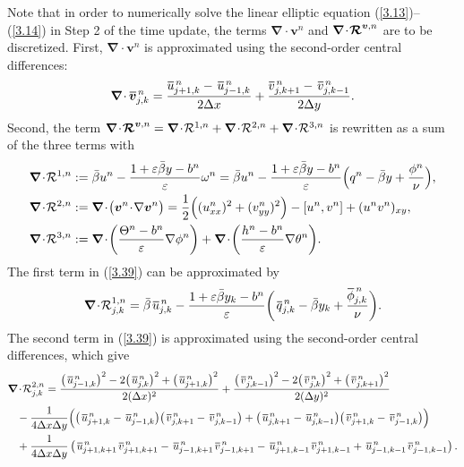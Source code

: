 \documentclass[a4paper,11pt,twoside]{article}
\numberwithin{equation}{section}
\numberwithin{figure}{section}
\numberwithin{table}{section}
\newcommand{\hf}{\frac{1}{2}}
\newcommand{\bnabla}{\bm{\nabla}}
\newcommand{\eps}{\varepsilon}
\newcommand{\dx}{\Delta x}
\newcommand{\dy}{\Delta y}
\newcommand{\bv}{\bm{v}}
\newcommand\eref[1]{(\ref{#1})}
\newcommand*\xbar[1]{%
	\hbox{%
		\vbox{%
			\hrule height 0.5pt %
			\kern0.3ex%
			\hbox{%
				\kern-0.05em%
				\ensuremath{#1}%
				\kern-0.02em%
			}%
		}%
	}%
}
\begin{document}
Note that in order to numerically solve the linear elliptic equation \eref{3.13}--\eref{3.14} in Step 2 of the time update, the terms 
$\bnabla\!\cdot\!\bv^n$ and $\bnabla\!\cdot\!\bm{{\cal R}}^{\bv,n}$ are to be discretized. First, $\bnabla\!\cdot\!\bv^n$ is approximated
using the second-order central differences:
\begin{equation}
\bnabla\!\cdot\xbar{\bv}_{j,k}^{\,n}=\frac{\xbar u_{j+1,k}^{\,n}-\,\xbar u_{j-1,k}^{\,n}}{2\dx}+
\frac{\xbar v_{j,k+1}^{\,n}-\,\xbar v_{j,k-1}^{\,n}}{2\dy}.
\label{3.38}
\end{equation}
Second, the term $\bnabla\!\cdot\!\bm{{\cal R}}^{\bv,n}=\bnabla\!\cdot\!{\cal R}^{1,n}+\bnabla\!\cdot\!{\cal R}^{2,n}+
\bnabla\!\cdot\!{\cal R}^{3,n}$ is rewritten as a sum of the three terms with
\begin{equation}
\begin{aligned}
&\bnabla\!\cdot\!{\cal R}^{1,n}:=\bar{\beta}u^n-\frac{1+\eps\bar{\beta}y-b^n}{\eps}\omega^n=\bar{\beta}u^n-
\frac{1+\eps\bar{\beta}y-b^n}{\eps}\Big(q^n-\bar{\beta}y+\frac{\phi^n}{\nu}\Big),\\	
&\bnabla\!\cdot\!{\cal R}^{2,n}:=\bnabla\!\cdot\!\big(\bv^n\!\cdot\!\nabla\bv^n\big)=\hf\Big((u^n_{xx})^2+(v^n_{yy})^2\Big)-
[u^n,v^n]+(u^nv^n)_{xy},\\
&\bnabla\!\cdot\!{\cal R}^{3,n}:=\bnabla\!\cdot\!\bigg(\frac{\Theta^n-b^n}{\eps}\nabla\phi^n\bigg)+
\bnabla\!\cdot\!\bigg(\frac{h^n-b^n}{\eps}\nabla\theta^n\bigg).
\end{aligned}
\label{3.39}
\end{equation}
The first term in \eref{3.39} can be approximated by
\begin{equation}
\bnabla\!\cdot\!{\cal R}^{1,n}_{j,k}=\bar{\beta}\,\xbar u_{j,k}^{\,n}-\frac{1+\eps\bar{\beta}y_k-b^n}{\eps}\bigg(\,\xbar q_{j,k}^{\,n}-
\bar{\beta}y_k+\frac{\xbar{\phi}_{j,k}^{\,n}}{\nu}\bigg).
\label{3.40}
\end{equation}
The second term in \eref{3.39} is approximated using the second-order central differences, which give
\begin{equation}
\begin{aligned}
\bnabla\!\cdot\!{\cal R}_{j,k}^{2,n}&=\frac{\big(\,\xbar u^{\,n}_{j-1,k}\big)^2-2\big(\,\xbar u^{\,n}_{j,k}\big)^2+
\big(\,\xbar u^{\,n}_{j+1,k}\big)^2}{2(\dx)^2}+\frac{\big(\,\xbar v^{\,n}_{j,k-1}\big)^2-2\big(\,\xbar v^{\,n}_{j,k}\big)^2+
\big(\,\xbar v^{\,n}_{j,k+1}\big)^2}{2(\dy)^2}\\
&\hspace*{-0.9cm}-\frac{1}{4\dx\dy}\Big(\big(\,\xbar u_{j+1,k}^{\,n}-\,\xbar u_{j-1,k}^{\,n}\big)
\big(\,\xbar v_{j,k+1}^{\,n}-\,\xbar v_{j,k-1}^{\,n}\big)+
\big(\,\xbar u_{j,k+1}^{\,n}-\,\xbar u_{j,k-1}^{\,n}\big)\big(\,\xbar v_{j+1,k}^{\,n}-\,\xbar v_{j-1,k}^{\,n}\big)\Big)\\
&\hspace*{-0.9cm}+\frac{1}{4\dx\dy}
\left(\,\xbar u_{j+1,k+1}^{\,n}\,\xbar v_{j+1,k+1}^{\,n}-\,\xbar u_{j-1,k+1}^{\,n}\,\xbar v_{j-1,k+1}^{\,n}
-\,\xbar u_{j+1,k-1}^{\,n}\,\xbar v_{j+1,k-1}^{\,n}+\,\xbar u_{j-1,k-1}^{\,n}\,\xbar v_{j-1,k-1}^{\,n}\right).
\end{aligned}
\label{3.41}
\end{equation}
\end{document}
